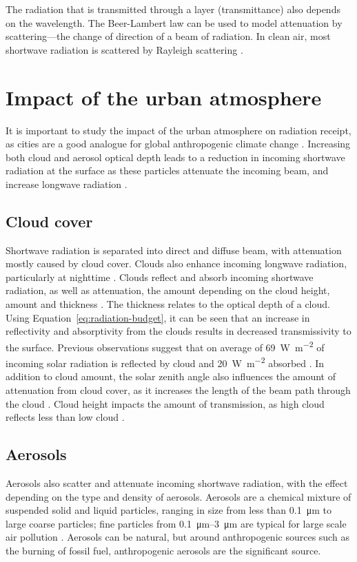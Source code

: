 \documentclass[a4paper,titlepage, twoside]{report}
\begin{document}
The radiation that is transmitted through a layer (transmittance) also depends on the wavelength. The Beer-Lambert law can be used to model attenuation by scattering---the change of direction of a beam of radiation. In clean air, most shortwave radiation is scattered by Rayleigh scattering \parencite{chameides}.

\section{Impact of the urban atmosphere}
It is important to study the impact of the urban atmosphere on radiation receipt, as cities are a good analogue for global anthropogenic climate change \parencite{cleugh}.  Increasing both cloud and aerosol optical depth leads to a reduction in incoming shortwave radiation at the surface as these particles attenuate the incoming beam, and increase longwave radiation \parencite{ipcc}.

\subsection{Cloud cover}
Shortwave radiation is separated into direct and diffuse beam, with attenuation mostly caused by cloud cover. Clouds also enhance incoming longwave radiation, particularly at nighttime \parencite{kotthaus1}.  Clouds reflect and absorb incoming shortwave radiation, as well as attenuation, the amount depending on the cloud height, amount and thickness \parencite{iqbal}.  The thickness relates to the optical depth of a cloud. Using Equation~\ref{eq:radiation-budget}, it can be seen that an increase in reflectivity and absorptivity from the clouds results in decreased transmissivity to the surface. Previous observations suggest that on average of \SI{69}{\watt\per\meter\squared} of incoming solar radiation is reflected by cloud and \SI{20}{\watt\per\meter\squared} absorbed \parencite{salby}.  In addition to cloud amount, the solar zenith angle also influences the amount of attenuation from cloud cover, as it increases the length of the beam path through the cloud \parencite{oke}.  Cloud height impacts the amount of transmission, as high cloud reflects less than low cloud \parencite{liou}.

\subsection{Aerosols}
Aerosols also scatter and attenuate incoming shortwave radiation, with the effect depending on the type and density of aerosols. Aerosols are a chemical mixture of suspended solid and liquid particles, ranging in size from less than \SI{0.1}{\micro\meter} to large coarse particles; fine particles from \SIrange{0.1}{3}{\micro\meter} are typical for large scale air pollution \parencite{chameides}.  Aerosols can be natural, but around anthropogenic sources such as the burning of fossil fuel, anthropogenic aerosols are the significant source. 
\end{document}
